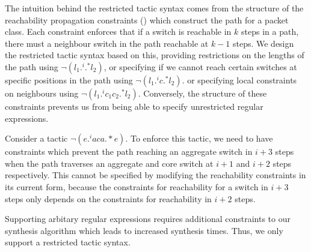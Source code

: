 The intuition behind the restricted tactic syntax comes from the structure of the reachability propagation 
constraints () which construct the path for a packet class. Each constraint enforces that if a switch is reachable in $k$ steps in a path,
 there must a neighbour switch in the path reachable at $k-1$ steps. We design the restricted tactic syntax based
  on this, providing restrictions on the lengths of the path using $\neg (l_1 .^i .^* l_2)$, or specifying if we cannot 
  reach certain switches at specific positions in the path using  $\neg (l_1 .^i c .^* l_2)$. or specifying local 
  constraints on neighbours using $\neg (l_1  .^i c_1 c_2 .^* l_2)$.  
  Conversely, the structure of these constraints 
  prevents us from being able to specify unrestricted regular expressions. 
  \begin{example}
  Consider a tactic $\neg(e .^i a c a .*e)$. To enforce
  this tactic, we need to have constraints which prevent the path reaching an aggregate switch in $i+3$
  steps when the path traverses an aggregate and core switch at $i+1$ and $i+2$ steps
  respectively. This cannot be specified by modifying the reachability 
  constraints in its current form, 
  because the constraints for reachability for a switch in $i + 3$ steps only depends on 
  the constraints for reachability in $i+2$ steps. 
   \end{example}
   Supporting arbitary regular expressions
   requires additional constraints to our synthesis algorithm which leads to increased synthesis times. Thus, we only support a restricted tactic syntax.   

